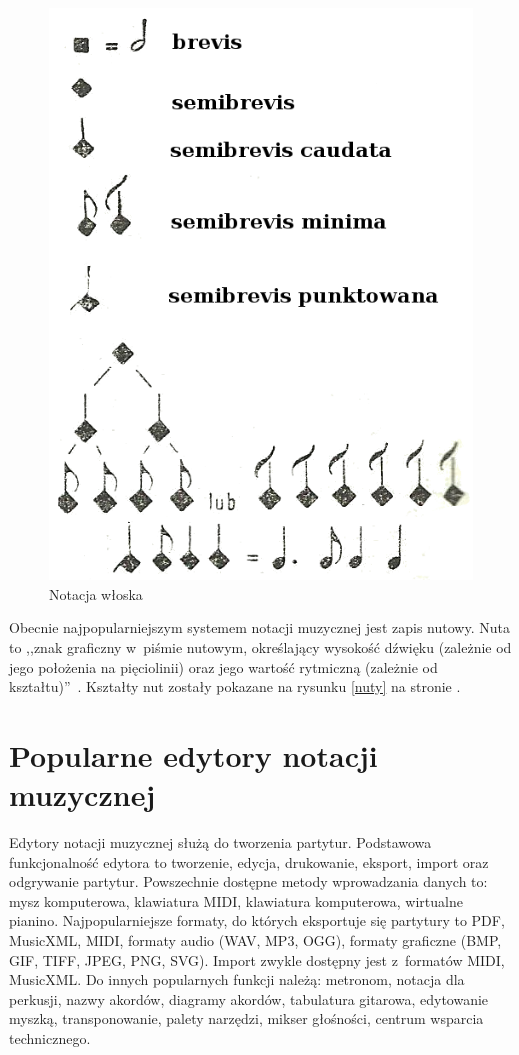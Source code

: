 \documentclass[polish,thesis,12pt]{dcsbook}
\begin{document}
\begin{figure}[H]
\begin{minipage}[t]{0.45\textwidth}
    \includegraphics[scale=1.9,bb=0 0 120 161]{img/notacja wloska.png}
    \caption{Notacja włoska~\cite{Encyklopedia}}
    \label{notacja_wloska}
  \end{minipage}
\end{figure}

Obecnie najpopularniejszym systemem notacji muzycznej jest zapis nutowy. Nuta to ,,znak graficzny w~piśmie nutowym, określający wysokość dźwięku (zależnie od jego położenia na pięciolinii) oraz jego wartość rytmiczną (zależnie od kształtu)''~\cite{Slowniczek}. Kształty nut zostały pokazane na rysunku \ref{nuty} na stronie \pageref{nuty}.

\section{Popularne edytory notacji muzycznej}
Edytory notacji muzycznej służą do tworzenia partytur. Podstawowa funkcjonalność edytora to tworzenie, edycja, drukowanie, eksport, import oraz odgrywanie partytur. Powszechnie dostępne metody wprowadzania danych to: mysz komputerowa, klawiatura MIDI, klawiatura komputerowa, wirtualne pianino. Najpopularniejsze formaty, do których eksportuje się partytury to PDF, MusicXML, MIDI, formaty audio (WAV, MP3, OGG), formaty graficzne (BMP, GIF, TIFF, JPEG, PNG, SVG). Import zwykle dostępny jest z~formatów MIDI, MusicXML. Do innych popularnych funkcji należą: metronom, notacja dla perkusji, nazwy akordów, diagramy akordów, tabulatura gitarowa, edytowanie myszką, transponowanie, palety narzędzi, mikser głośności, centrum wsparcia technicznego.
\end{document}
